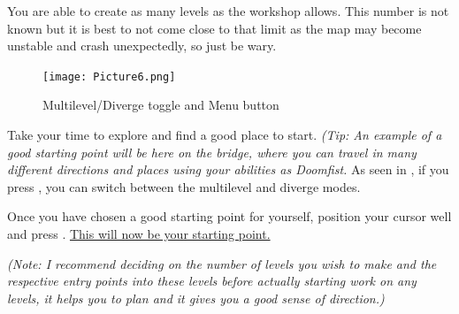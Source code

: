 \documentclass[12pt,a4paper]{article}
\begin{document}
        You are able to create as many levels as the workshop allows. This number is not known but it is best to not come close to that limit as the map may become unstable and crash unexpectedly, so just be wary.
        
        \begin{figure}[ht]
            \centering
            \texttt{[image: Picture6.png]}
            \caption{Multilevel/Diverge toggle and Menu button}
            \label{fig:Picture6}
        \end{figure}
        
        Take your time to explore and find a good place to start. \textit{(Tip: An example of a good starting point will be here on the bridge, where you can travel in many different directions and places using your abilities as Doomfist.} As seen in , if you press , you can switch between the multilevel and diverge modes.
        
        Once you have chosen a good starting point for yourself, position your cursor well and press . \underline{This will now be your starting point.}

        \textit{(Note: I recommend deciding on the number of levels you wish to make and the respective entry 
            points into these levels before actually starting work on any levels, it helps you to plan and it 
            gives you a good sense of direction.)}  
        
\end{document}
